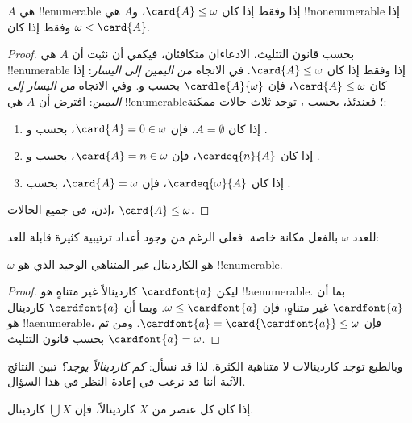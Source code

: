 \documentclass[../../../include/open-logic-section]{subfiles}
\begin{document}
\begin{prop}
$A$ هي !!{enumerable} إذا وفقط إذا كان $\card{A} \leq \omega$، و$A$
هي !!{nonenumerable} إذا وفقط إذا كان $\omega < \card{A}$.
\end{prop}

\begin{proof}
بحسب قانون التثليث، الادعاءان متكافئان، فيكفي أن نثبت أن $A$ هي
!!{enumerable} إذا وفقط إذا كان $\card{A} \leq \omega$. في الاتجاه
\emph{من اليمين إلى اليسار}: إذا كان $\card{A} \leq \omega$، فإن
$\cardle{A}{\omega}$ بحسب
و. وفي الاتجاه \emph{من اليسار إلى اليمين}:
افترض أن $A$ هي !!{enumerable}؛ فعندئذ، بحسب
، توجد ثلاث حالات ممكنة:
\begin{enumerate}
	\item إذا كان $A = \emptyset$، فإن $\card{A} = 0 \in \omega$، بحسب
	 و
	.
	\item إذا كان $\cardeq{n}{A}$، فإن $\card{A} = n \in \omega$، بحسب
	 و
	.
	\item إذا كان $\cardeq{\omega}{A}$، فإن $\card{A} = \omega$، بحسب
	.
\end{enumerate}
إذن، في جميع الحالات، $\card{A} \leq \omega$.
\end{proof}
\noindent
للعدد $\omega$ بالفعل مكانة خاصة. فعلى الرغم من وجود أعداد ترتيبية كثيرة
قابلة للعد:

\begin{cor}
$\omega$ هو الكاردينال غير المتناهي الوحيد الذي هو !!{enumerable}.
\end{cor}

\begin{proof}
ليكن $\cardfont{a}$ كاردينالاً غير متناهٍ هو !!a{enumerable}. بما أن
$\cardfont{a}$ غير متناهٍ، فإن $\omega \leq \cardfont{a}$. وبما أن
$\cardfont{a}$ كاردينال هو !!a{enumerable}، فإن
$\cardfont{a} = \card{\cardfont{a}} \leq \omega$. ومن ثم
$\cardfont{a} = \omega$ بحسب قانون التثليث.
\end{proof}

وبالطبع توجد كاردينالات لا متناهية الكثرة. لذا قد نسأل:
\emph{كم كاردينالاً يوجد؟} تبين النتائج الآتية أننا قد نرغب في إعادة
النظر في هذا السؤال.

\begin{prop}
إذا كان كل عنصر من $X$ كاردينالاً، فإن $\bigcup X$ كاردينال.
\end{prop}
\end{document}
